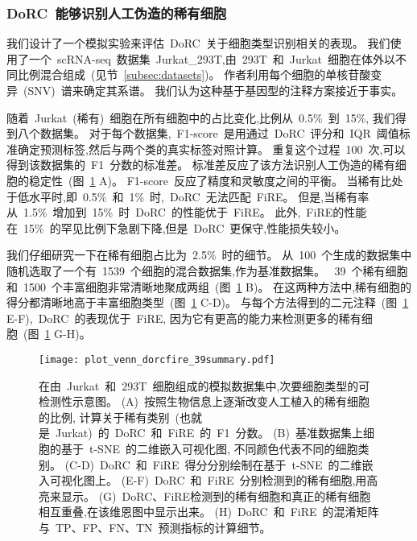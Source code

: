 \subsubsection{DoRC~能够识别人工伪造的稀有细胞}
\label{subsec:recplanted} 
我们设计了一个模拟实验来评估~DoRC~关于细胞类型识别相关的表现。
我们使用了一个~scRNA-seq~数据集~Jurkat\_293T,由~293T~和~Jurkat~细胞在体外以不同比例混合组成~(见节~\ref{subsec:datasets})。
作者利用每个细胞的单核苷酸变异~(SNV)~谱来确定其系谱。
我们认为这种基于基因型的注释方案接近于事实。

随着~Jurkat~(稀有)~细胞在所有细胞中的占比变化,比例从~0.5\%~到~15\%,
我们得到八个数据集。
对于每个数据集,~F1-score~是用通过~DoRC~评分和~IQR~阈值标准确定预测标签,然后与两个类的真实标签对照计算。
重复这个过程~100~次,可以得到该数据集的~F1~分数的标准差。
标准差反应了该方法识别人工伪造的稀有细胞的稳定性~(图~\ref{fig:jurkat} A)。 
F1-score~反应了精度和灵敏度之间的平衡。
当稀有比处于低水平时,即~0.5\%~和~1\%~时,~DoRC~无法匹配~FiRE。
但是,当稀有率从~1.5\%~增加到~15\%~时~DoRC~的性能优于~FiRE。
此外,~FiRE的性能在~15\%~的罕见比例下急剧下降,但是~DoRC~更保守,性能损失较小。

我们仔细研究一下在稀有细胞占比为~2.5\%~时的细节。
从~100~个生成的数据集中随机选取了一个有~1539~个细胞的混合数据集,作为基准数据集。
~39~个稀有细胞和~1500~个丰富细胞非常清晰地聚成两组~(图~\ref{fig:jurkat} B)。
在这两种方法中,稀有细胞的得分都清晰地高于丰富细胞类型~(图~\ref{fig:jurkat} C-D)。
与每个方法得到的二元注释~(图~\ref{fig:jurkat} E-F),~DoRC~的表现优于~FiRE,
因为它有更高的能力来检测更多的稀有细胞~(图~\ref{fig:jurkat} G-H)。

\begin{figure}[!htbp]
    \centering
    \texttt{[image: plot\_venn\_dorcfire\_39summary.pdf]}
    \caption{
    在由~Jurkat~和~293T~细胞组成的模拟数据集中,次要细胞类型的可检测性示意图。
    (A)~按照生物信息上逐渐改变人工植入的稀有细胞的比例, 计算关于稀有类别~(也就是~Jurkat)~的~DoRC~和~FiRE~的~F1~分数。
    (B)~基准数据集上细胞的基于~t-SNE~的二维嵌入可视化图, 不同颜色代表不同的细胞类别。
    (C-D)~DoRC~和~FiRE~得分分别绘制在基于~t-SNE~的二维嵌入可视化图上。
    (E-F)~DoRC~和~FiRE~分别检测到的稀有细胞,用高亮来显示。
    (G)~DoRC、FiRE检测到的稀有细胞和真正的稀有细胞相互重叠,在该维恩图中显示出来。
    (H)~DoRC~和~FiRE~的混淆矩阵与~TP、FP、FN、TN~预测指标的计算细节。
    }
    \label{fig:jurkat}
\end{figure}

